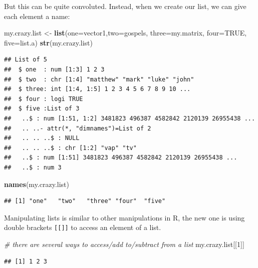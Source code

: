 \documentclass[]{article}
\newenvironment{Shaded}{\begin{snugshade}}{\end{snugshade}}
\newcommand{\KeywordTok}[1]{\textcolor[rgb]{0.13,0.29,0.53}{\textbf{#1}}}
\newcommand{\DataTypeTok}[1]{\textcolor[rgb]{0.13,0.29,0.53}{#1}}
\newcommand{\DecValTok}[1]{\textcolor[rgb]{0.00,0.00,0.81}{#1}}
\newcommand{\StringTok}[1]{\textcolor[rgb]{0.31,0.60,0.02}{#1}}
\newcommand{\CommentTok}[1]{\textcolor[rgb]{0.56,0.35,0.01}{\textit{#1}}}
\newcommand{\OtherTok}[1]{\textcolor[rgb]{0.56,0.35,0.01}{#1}}
\newcommand{\NormalTok}[1]{#1}
\begin{document}
But this can be quite convoluted. Instead, when we create our list, we
can give each element a name:

\begin{Shaded}
\begin{Highlighting}[]
\NormalTok{my.crazy.list <-}\StringTok{ }\KeywordTok{list}\NormalTok{(}\DataTypeTok{one=}\NormalTok{vector1,}\DataTypeTok{two=}\NormalTok{gospels, }\DataTypeTok{three=}\NormalTok{my.matrix, }\DataTypeTok{four=}\OtherTok{TRUE}\NormalTok{, }\DataTypeTok{five=}\NormalTok{list.a)}
\KeywordTok{str}\NormalTok{(my.crazy.list)}
\end{Highlighting}
\end{Shaded}

\begin{verbatim}
## List of 5
##  $ one  : num [1:3] 1 2 3
##  $ two  : chr [1:4] "matthew" "mark" "luke" "john"
##  $ three: int [1:4, 1:5] 1 2 3 4 5 6 7 8 9 10 ...
##  $ four : logi TRUE
##  $ five :List of 3
##   ..$ : num [1:51, 1:2] 3481823 496387 4582842 2120139 26955438 ...
##   .. ..- attr(*, "dimnames")=List of 2
##   .. .. ..$ : NULL
##   .. .. ..$ : chr [1:2] "vap" "tv"
##   ..$ : num [1:51] 3481823 496387 4582842 2120139 26955438 ...
##   ..$ : num 3
\end{verbatim}

\begin{Shaded}
\begin{Highlighting}[]
\KeywordTok{names}\NormalTok{(my.crazy.list)}
\end{Highlighting}
\end{Shaded}

\begin{verbatim}
## [1] "one"   "two"   "three" "four"  "five"
\end{verbatim}

Manipulating lists is similar to other manipulations in R, the new one
is using double brackets \texttt{[[]]} to access an element of a list.

\begin{Shaded}
\begin{Highlighting}[]
\CommentTok{# there are several ways to access/add to/subtract from a list}
\NormalTok{my.crazy.list[[}\DecValTok{1}\NormalTok{]]}
\end{Highlighting}
\end{Shaded}

\begin{verbatim}
## [1] 1 2 3
\end{verbatim}
\end{document}
